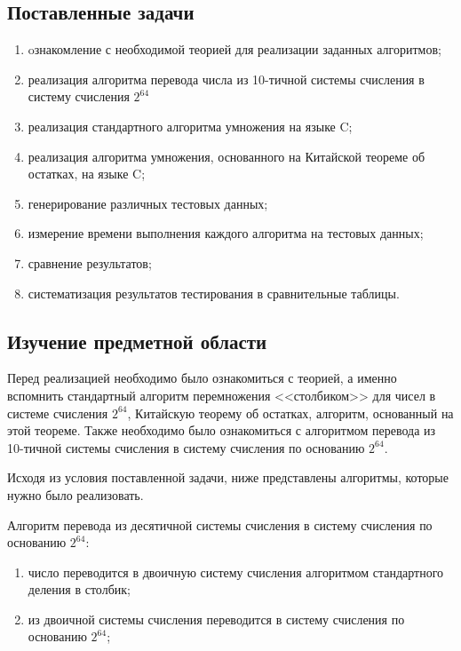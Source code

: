 \documentclass[14pt, russian]{scrartcl}
\begin{document}
\subsection{Поставленные задачи}
\begin{enumerate}
\item oзнакомление с необходимой теорией для реализации заданных алгоритмов;
\item реализация алгоритма перевода числа из 10-тичной системы счисления в систему счисления $2^{64}$
\item реализация стандартного алгоритма умножения на языке C;
\item реализация алгоритма умножения, основанного на Китайской теореме об остатках, на языке C;
\item генерирование различных тестовых данных;
\item измерение времени выполнения каждого алгоритма на тестовых данных;
\item сравнение результатов;
\item систематизация результатов тестирования в сравнительные таблицы.
\end{enumerate}

\subsection{Изучение предметной области}
Перед реализацией необходимо было ознакомиться с теорией, а именно вспомнить стандартный алгоритм перемножения <<столбиком>> для чисел в системе счисления $2^{64}$, Китайскую теорему об остатках, алгоритм, основанный на этой теореме. Также необходимо было ознакомиться с алгоритмом перевода из 10-тичной системы счисления в систему счисления по основанию $2^{64}$.

Исходя из условия поставленной задачи, ниже представлены алгоритмы, которые нужно было реализовать.

Алгоритм перевода из десятичной системы счисления в систему счисления по основанию $2^{64}$:
\begin{enumerate}
    \item число переводится в двоичную систему счисления алгоритмом стандартного деления в столбик;
    \item из двоичной системы счисления переводится в систему счисления по основанию $2^{64}$;
\end{enumerate}
\end{document}
